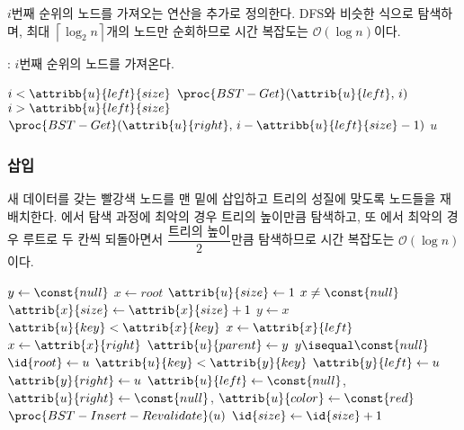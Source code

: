 $i$번째 순위의 노드를 가져오는 연산을 추가로 정의한다. DFS와 비슷한 식으로 탐색하며, 최대 $\left\lceil\log_2 n\right\rceil$개의 노드만 순회하므로
시간 복잡도는 $\mathcal{O}\left(\log n\right)$이다.

: $i$번째 순위의 노드를 가져온다.

\begin{codebox}
\li \If $i < \attribb{u}{left}{size}$ \Then
\li     \Return $\proc{BST-Get}(\attrib{u}{left},\,i)$
\li \ElseIf $i > \attribb{u}{left}{size}$ \Then
\li     \Return $\proc{BST-Get}(\attrib{u}{right},\,i-\attribb{u}{left}{size}-1)$
\li \ElseNoIf
\li     \Return $u$
    \End
\end{codebox}

\newpage

\subsubsection{삽입} 새 데이터를 갖는 빨강색 노드를 맨 밑에 삽입하고 트리의 성질에 맞도록 노드들을 재배치한다.
에서 탐색 과정에 최악의 경우 트리의 높이만큼 탐색하고, 또 에서 최악의 경우
루트로 두 칸씩 되돌아면서 $\dfrac{\mbox{트리의 높이}}{2}$만큼 탐색하므로 시간 복잡도는 $\mathcal{O}\left(\log n\right)$이다.

\begin{codebox}
\li $y \gets \const{null}$
\li $x \gets root$
\li $\attrib{u}{size} \gets 1$
\li \While $x \neq \const{null}$ \Do
\li     $\attrib{x}{size} \gets \attrib{x}{size} + 1$
\li     $y \gets x$
\li     \If $\attrib{u}{key} < \attrib{x}{key}$ \Then
\li         $x \gets \attrib{x}{left}$
\li     \ElseNoIf
\li         $x \gets \attrib{x}{right}$
        \End
    \End
\li $\attrib{u}{parent} \gets y$
\li \If $y \isequal \const{null}$ \Then
\li     $\id{root} \gets u$
\li \ElseIf $\attrib{u}{key} < \attrib{y}{key}$ \Then
\li     $\attrib{y}{left} \gets u$
\li \ElseNoIf
\li     $\attrib{y}{right} \gets u$
    \End
\li $\attrib{u}{left} \gets \const{null}$, $\attrib{u}{right} \gets \const{null}$, $\attrib{u}{color} \gets \const{red}$ 
\li $\proc{BST-Insert-Revalidate}(u)$
\li $\id{size} \gets \id{size} + 1$
\end{codebox}

\newpage
    
